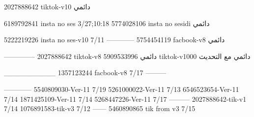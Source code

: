 2027888642 tiktok-v10
دائمي

6189792841 insta no ses
3/27;10:18
5774028106 insta no sesidi
دائمي

5222219226 insta no ses-v10
7/11
------------
5754454119 facbook-v8
دائمي


--------------
2027888642 tiktok-v8
دائمي
5909533996 tiktok-v1000
دائمي مع التحديث

__________
1357123244 facbook-v8
7/17
---------

------------
5540809030-Ver-11
7/19
5261000022-Ver-11
7/13
6546523654-Ver-11
7/14
1871425109-Ver-11
7/14
5268447226-Ver-11
7/17
---------
2027888642-tik-v1
7/14
1076891583-tik-v3
7/12
------
5460890865 tik from v3
7/15
